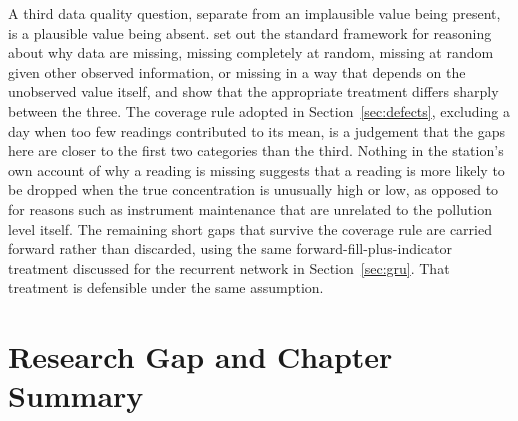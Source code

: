 \documentclass[12pt,a4paper]{report}
\begin{document}
A third data quality question, separate from an implausible value being
present, is a plausible value being absent. \citet{little2019missing} set
out the standard framework for reasoning about why data are missing, missing
completely at random, missing at random given other observed information, or
missing in a way that depends on the unobserved value itself, and show that
the appropriate treatment differs sharply between the three. The coverage
rule adopted in Section~\ref{sec:defects}, excluding a day when too few
readings contributed to its mean, is a judgement that the gaps here are
closer to the first two categories than the third. Nothing in the station's
own account of why a reading is missing suggests that a reading is more
likely to be dropped when the true concentration is unusually high or low,
as opposed to for reasons such as instrument maintenance that are unrelated
to the pollution level itself. The remaining short gaps that survive the
coverage rule are carried forward rather than discarded, using the same
forward-fill-plus-indicator treatment discussed for the recurrent network in
Section~\ref{sec:gru}. That treatment is defensible under the same
assumption.

\section{Research Gap and Chapter Summary}
\end{document}
